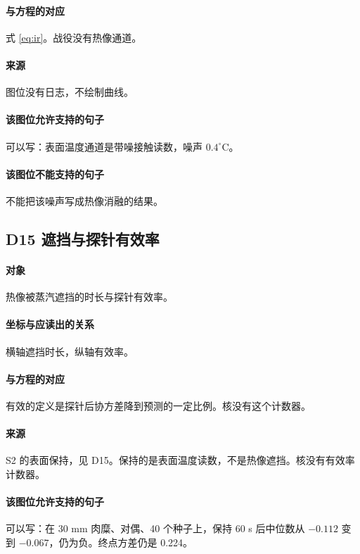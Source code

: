 \paragraph{与方程的对应}
式 \eqref{eq:ir}。战役没有热像通道。

\paragraph{来源}
图位没有日志，不绘制曲线。

\paragraph{该图位允许支持的句子}
可以写：表面温度通道是带噪接触读数，噪声 $0.4^\circ\mathrm{C}$。

\paragraph{该图位不能支持的句子}
不能把该噪声写成热像消融的结果。

\subsection{D15 遮挡与探针有效率}
\paragraph{对象}
热像被蒸汽遮挡的时长与探针有效率。

\paragraph{坐标与应读出的关系}
横轴遮挡时长，纵轴有效率。

\paragraph{与方程的对应}
有效的定义是探针后协方差降到预测的一定比例。核没有这个计数器。

\paragraph{来源}
S2 的表面保持，见 D15。保持的是表面温度读数，不是热像遮挡。核没有有效率计数器。

\paragraph{该图位允许支持的句子}
可以写：在 30 mm 肉糜、对偶、40 个种子上，保持 60 s 后中位数从 \(-0.112\) 变到 \(-0.067\)，仍为负。终点方差仍是 0.224。

